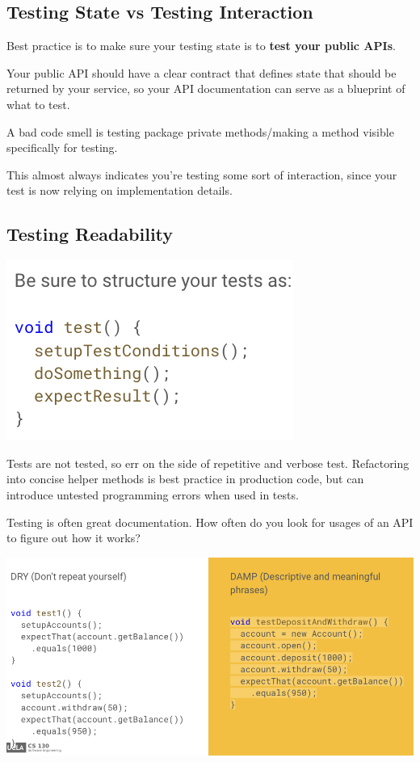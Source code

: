 \documentclass{article}
\begin{document}
\subsection{Testing State vs Testing Interaction}

Best practice is to make sure your testing state is to \textbf{test your public APIs}.

Your public API should have a clear contract that defines state that should be returned by your service, so your API documentation can serve as a blueprint of what to test.

\vspace*{1em}

A bad code smell is testing package private methods/making a method visible specifically for testing.

This almost always indicates you're testing some sort of interaction, since your test is now relying on implementation details.

\subsection{Testing Readability}

\includegraphics*[width=0.5\linewidth]{testStructure.png}

Tests are not tested, so err on the side of repetitive and verbose test. Refactoring into concise helper methods is best practice in production code, but can introduce untested programming errors when used in tests.

\vspace*{1em}

Testing is often great documentation. How often do you look for usages of an API to figure out how it works?

\includegraphics*[width=\linewidth]{testingDRYDAMP.png}
\end{document}
